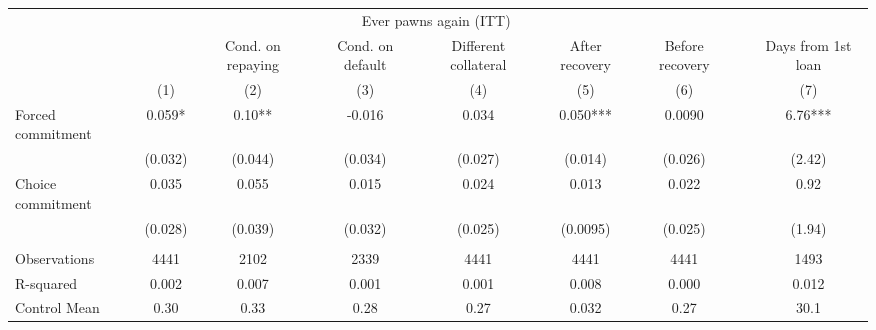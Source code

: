 \begin{tabular}{lcccccccc}
\toprule
      & \multicolumn{6}{c}{Ever pawns again (ITT)}    &       &  \\
\cmidrule{2-7}      &       & Cond. on repaying & Cond. on default & Different collateral & After recovery & Before recovery &       & Days from 1st loan  \\
\midrule
\midrule
      & (1)   & (2)   & (3)   & (4)   & (5)   & (6)   &       & (7) \\
\midrule
\midrule
Forced commitment & 0.059* & 0.10** & -0.016 & 0.034 & 0.050*** & 0.0090 &       & 6.76*** \\
      & (0.032) & (0.044) & (0.034) & (0.027) & (0.014) & (0.026) &       & (2.42) \\
Choice commitment & 0.035 & 0.055 & 0.015 & 0.024 & 0.013 & 0.022 &       & 0.92 \\
      & (0.028) & (0.039) & (0.032) & (0.025) & (0.0095) & (0.025) &       & (1.94) \\
      &       &       &       &       &       &       &       &  \\
\midrule
Observations & 4441  & 2102  & 2339  & 4441  & 4441  & 4441  &       & 1493 \\
R-squared & 0.002 & 0.007 & 0.001 & 0.001 & 0.008 & 0.000 &       & 0.012 \\
Control Mean & 0.30  & 0.33  & 0.28  & 0.27  & 0.032 & 0.27  &       & 30.1 \\
\bottomrule
\bottomrule
\end{tabular}%
